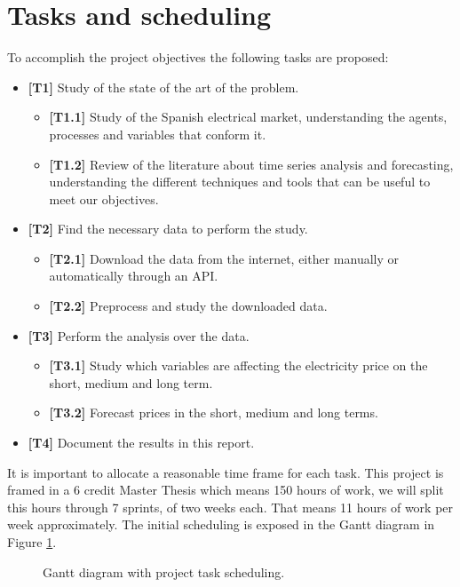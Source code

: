 \section{Tasks and scheduling}
To accomplish the project objectives the following tasks are proposed:
\begin{itemize}
    \item \textbf{[T1]} Study of the state of the art of the problem.
    \begin{itemize}
        \item \textbf{[T1.1]} Study of the Spanish electrical market, understanding the agents, processes and variables that conform it.
        \item \textbf{[T1.2]} Review of the literature about time series analysis and forecasting, understanding the different techniques and tools that can be useful to meet our objectives.
    \end{itemize}
    \item \textbf{[T2]} Find the necessary data to perform the study.
    \begin{itemize}
        \item \textbf{[T2.1]} Download the data from the internet, either manually or automatically through an API.
        \item \textbf{[T2.2]} Preprocess and study the downloaded data.
    \end{itemize}
    \item \textbf{[T3]} Perform the analysis over the data.
    \begin{itemize}
        \item \textbf{[T3.1]} Study which variables are affecting the electricity price on the short, medium and long term.
        \item \textbf{[T3.2]} Forecast prices in the short, medium and long terms.
    \end{itemize}
    \item \textbf{[T4]} Document the results in this report.
\end{itemize}

It is important to allocate a reasonable time frame for each task. This project is framed in a 6 credit Master Thesis which means 150 hours of work, we will split this hours through 7 sprints, of two weeks each. That means 11 hours of work per week approximately. The initial scheduling is exposed in the Gantt diagram in Figure \ref{fig:planning-gantt}.

\begin{figure}[H]
\centering
    \caption{Gantt diagram with project task scheduling.}
    \label{fig:planning-gantt}
\end{figure}
